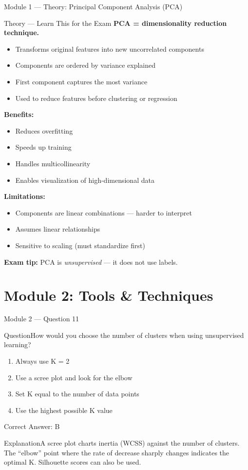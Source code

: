\documentclass[aspectratio=169,10pt]{beamer}
\newcommand{\question}[1]{\begin{block}{Question}#1\end{block}}
\newcommand{\options}[4]{%
	\begin{enumerate}[label=\Alph*.,leftmargin=*]
		\item #1
		\item #2
		\item #3
		\item #4
	\end{enumerate}
}
\newcommand{\answerbox}[1]{\begin{exampleblock}{Correct Answer: #1}\end{exampleblock}}
\newcommand{\explain}[1]{\begin{block}{Explanation}#1\end{block}}
\newcommand{\theory}[1]{%
	\begin{block}{Theory --- Learn This for the Exam}
		\small #1
	\end{block}
}
\begin{document}
	\begin{frame}{Module 1 --- Theory: Principal Component Analysis (PCA)}
		\theory{
			\textbf{PCA = dimensionality reduction technique.}
			\begin{itemize}
				\item Transforms original features into new uncorrelated components
				\item Components are ordered by variance explained
				\item First component captures the most variance
				\item Used to reduce features before clustering or regression
			\end{itemize}
			\textbf{Benefits:}
			\begin{itemize}
				\item Reduces overfitting
				\item Speeds up training
				\item Handles multicollinearity
				\item Enables visualization of high-dimensional data
			\end{itemize}
			\textbf{Limitations:}
			\begin{itemize}
				\item Components are linear combinations --- harder to interpret
				\item Assumes linear relationships
				\item Sensitive to scaling (must standardize first)
			\end{itemize}
			\textbf{Exam tip:} PCA is \emph{unsupervised} --- it does not use labels.
		}
	\end{frame}
	
	\section{Module 2: Tools \& Techniques}
	
	\begin{frame}{Module 2 --- Question 11}
		\question{How would you choose the number of clusters when using unsupervised learning?}
		\options{Always use K = 2}{Use a scree plot and look for the elbow}{Set K equal to the number of data points}{Use the highest possible K value}
		\answerbox{B}
		\explain{A scree plot charts inertia (WCSS) against the number of clusters. The ``elbow'' point where the rate of decrease sharply changes indicates the optimal K. Silhouette scores can also be used.}
	\end{frame}
	
\end{document}
